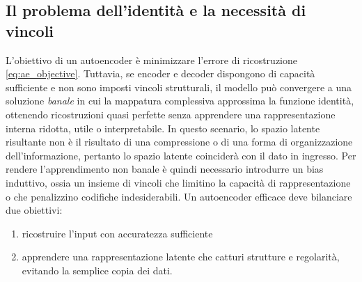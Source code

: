 \subsection{Il problema dell'identità e la necessità di vincoli}
\label{subsec:identity_problem}

L'obiettivo di un autoencoder è minimizzare l'errore di ricostruzione
\eqref{eq:ae_objective}. Tuttavia, se encoder e decoder dispongono di capacità
sufficiente e non sono imposti vincoli strutturali, il modello può convergere a
una soluzione \emph{banale} in cui la mappatura complessiva approssima la
funzione identità, ottenendo ricostruzioni quasi perfette senza apprendere una
rappresentazione interna 
ridotta, utile o interpretabile. In questo scenario, 
lo spazio latente risultante non è il risultato di una compressione o di una forma di organizzazione dell'informazione, pertanto lo spazio latente coinciderà con il dato in ingresso.
Per rendere l'apprendimento non banale è quindi necessario introdurre un
bias induttivo, ossia un insieme di vincoli che limitino la capacità
di rappresentazione o che penalizzino codifiche indesiderabili. 
Un autoencoder efficace deve bilanciare due obiettivi:
\begin{enumerate}[label=\roman*.]
    \item ricostruire l'input con accuratezza sufficiente
    \item apprendere una rappresentazione latente che catturi strutture e regolarità, evitando la semplice copia dei dati.
\end{enumerate}
